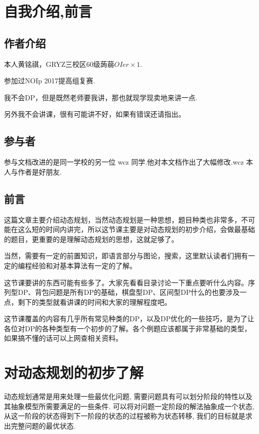 
\section{自我介绍,前言}
\subsection{作者介绍}
本人黄铭祺，GRYZ三校区60级蒟蒻$OIer\times 1$.

参加过NOIp 2017提高组复赛.

我不会DP，但是既然老师要我讲，那也就现学现卖地来讲一点.

 另外我不会讲课，很有可能讲不好，如果有错误还请指出。
\subsection{参与者}
	参与文档改进的是同一学校的另一位 wcz 同学.他对本文档作出了大幅修改.wcz 本人与作者是好朋友.

\subsection{前言}
这篇文章主要介绍动态规划，当然动态规划是一种思想，题目种类也非常多，不可能在这么短的时间内讲完，所以这节课主要是对动态规划的初步介绍，会做最基础的题目，更重要的是理解动态规划的思想，这就足够了。

当然，需要有一定的前置知识，即语言部分与图论，搜索，这里默认读者们拥有一定的编程经验和对基本算法有一定的了解。

这节课要讲的东西可能有些多了。大家先看看目录讨论一下重点要听什么内容。序列型DP、背包问题是所有DP的基础，棋盘型DP、区间型DP什么的也要涉及一点，剩下的类型就看讲课的时间和大家的理解程度吧。

这节课覆盖的内容有几乎所有常见种类的DP，以及DP优化的一些技巧，是为了让各位对DP的各种类型有一个初步的了解。各个例题应该都属于非常基础的类型，如果搞不懂的话可以上网查相关资料。


\newpage

\section{对动态规划的初步了解}
动态规划通常是用来处理一些最优化问题, 需要问题具有可以划分阶段的特性以及其抽象模型所需要满足的一些条件.
可以将对问题一定阶段的解法抽象成一个状态, 从这一阶段的状态得到下一阶段的状态的过程被称为状态转移, 我们的目标就是求出完整问题的最优状态.
